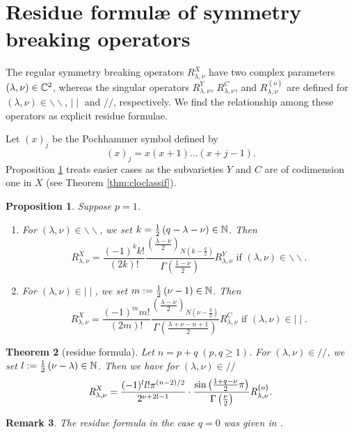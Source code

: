 \documentclass[reqno,12pt]{pja00} %
\newtheorem{theorem}{Theorem}[section]
\newtheorem{remark}[theorem]{Remark}
\newtheorem{proposition}[theorem]{Proposition}
\theoremstyle{definition}
\theoremstyle{exampstyle} \newtheorem{examp}[theorem]{Theorem}
\newcommand{\OpR}{\mbox{\it R}}
\begin{document}
\section{Residue {formul\ae} of symmetry breaking operators}
The regular symmetry breaking operators $R_{\lambda,\nu}^X$ have two complex parameters $(\lambda,\nu)\in\mathbb{C}^2$, whereas the singular operators $R_{\lambda,\nu}^Y$, $R_{\lambda,\nu}^C$, and
$R_{\lambda,\nu}^{ \left\{ o \right\}}$ are defined
for $(\lambda,\nu)\in\backslash\backslash$, $\mid\mid$ and $//$, respectively. We find the relationship
among these operators as explicit residue formulae. 

Let $\left( x \right)_j$ be the Pochhammer symbol defined by\begin{equation*}
	\left( x \right)_j=x(x+1)\dots(x+j-1).
\end{equation*}
Proposition \ref{prop} treats easier cases as the subvarieties $Y$ and $C$ are of codimension one in $X$ (see Theorem \ref{thm:cloclassif}).
\begin{proposition}\label{prop}
	Suppose $p=1$.\begin{enumerate}[(1)]
		\item For $(\lambda,\nu)\in\backslash\backslash$, we set $k=\frac{1}{2}\left( q-\lambda-\nu \right)\in\mathbb{N}$. Then
\begin{equation*}
R_{\lambda,\nu}^X=\frac{(-1)^kk!}{(2k)!}\frac{\left( \frac{\lambda-\nu}{2} \right)_{N\left(k-\frac{q}{2}  \right)}}{\Gamma\left( \frac{1-\nu}{2}\right) }R_{\lambda,\nu}^Y\mbox{ if }(\lambda,\nu)\in\backslash\backslash.
\end{equation*}
\item For $(\lambda,\nu)\in\mid\mid$, we set $m:=\frac{1}{2}\left( \nu-1 \right)\in\mathbb{N}$. Then
\begin{equation*}
R_{\lambda,\nu}^X=\frac{(-1)^mm!}{(2m)!}\frac{\left( \frac{\lambda-\nu}{2} \right)_{N\left( \nu-\frac{q}{2} \right)}}{\Gamma\left( \frac{\lambda+\nu-n+1}{2}\right)}R_{\lambda,\nu}^C\mbox{ if }(\lambda,\nu)\in\mid\mid.
\end{equation*}
	\end{enumerate}
\end{proposition}
\begin{theorem}[residue formula]
	Let $n=p+q\;(p,q\ge1)$.
	For $(\lambda,\nu)\in//$, we set $l:=\frac{1}{2}\left( \nu-\lambda \right)\in\mathbb{N}$. Then we have for $(\lambda,\nu)\in//$
  \[\OpR_{\lambda,\nu}^X  = \frac{ (- 1)^l l!\pi^{(n - 2) / 2} 
		}{2^{ \nu + 2 l-1}}\cdot  \frac{\sin\left( \frac{1+q-\nu}{2}\pi \right)}{\Gamma\left( \frac{\nu}{2} \right)}
	\OpR_{\lambda,\nu}^{ \left\{ o \right\} }. \]
	\end{theorem}
	\begin{remark}
		The residue formula in the case $q=0$ was given in \cite[Thm.\ 12.2]{kobayashi2015symmetry}.
	\end{remark}
\end{document}
